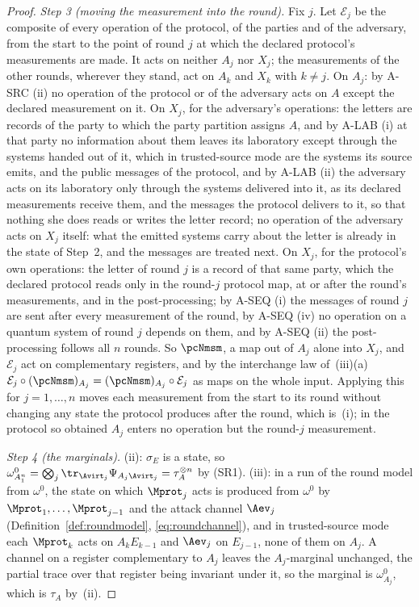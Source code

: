 \begin{proof}
\emph{Step 3 (moving the measurement into the round).} Fix $j$. Let
$\mathcal{E}_j$ be the composite of every operation of the protocol, of the
parties and of the adversary, from the start to the point of round $j$ at
which the declared protocol's measurements are made. It acts on neither $A_j$
nor $X_j$; the measurements of the other rounds, wherever they stand, act on
$A_k$ and $X_k$ with $k\ne j$. On $A_j$: by A-SRC (ii) no operation of the
protocol or of the adversary acts on $A$ except the declared measurement on it.
On $X_j$, for the adversary's operations: the letters are records of the
party to which the party partition assigns $A$, and by A-LAB (i) at that party
no information about them leaves its laboratory except through the systems
handed out of it, which in trusted-source mode are the systems its source
emits, and the public messages of the protocol, and by A-LAB (ii) the
adversary acts on its laboratory only through the systems delivered into it,
as its declared measurements receive them, and the messages the protocol
delivers to it, so that nothing she does reads or writes the letter record;
no operation of the adversary acts on $X_j$
itself: what the emitted systems carry about the
letter is already in the state of Step~2, and the messages are treated next. On $X_j$,
for the protocol's own operations: the letter of round $j$ is a record of
that same party, which the declared protocol
reads only in the round-$j$ protocol map, at or after the round's
measurements, and in the post-processing; by A-SEQ (i) the messages of round
$j$ are sent after every measurement of the round, by A-SEQ (iv) no operation
on a quantum system of round $j$ depends on them, and by A-SEQ (ii) the
post-processing follows all $n$ rounds. So $\pcNmsm$, a map out of $A_j$
alone into $X_j$, and $\mathcal{E}_j$ act on complementary registers, and by
the interchange law of \,(iii)(a)
$\mathcal{E}_j\circ(\pcNmsm)_{A_j}=(\pcNmsm)_{A_j}\circ\mathcal{E}_j$ as maps on
the whole input. Applying this for $j=1,\dots,n$ moves each measurement from
the start to its round without changing any state the protocol produces after
the round, which is~(i); in the protocol so obtained $A_j$ enters no operation
but the round-$j$ measurement.

\emph{Step 4 (the marginals).} (ii): $\sigma_E$ is a state, so
$\omega^{0}_{A_1^n}=\bigotimes_j\tr_{\Avirt_j}\Psi_{A_j\Avirt_j}
=\tau_A^{\otimes n}$ by (SR1). (iii): in a run of the round model from
$\omega^{0}$, the state on which $\Mprot_j$ acts is produced from $\omega^{0}$
by $\Mprot_1,\dots,\Mprot_{j-1}$ and the attack channel $\Aev_j$
(Definition~\ref{def:roundmodel}, \eqref{eq:roundchannel}), and in
trusted-source mode each $\Mprot_k$ acts on $A_kE_{k-1}$ and $\Aev_j$ on
$E_{j-1}$, none of them on $A_j$. A channel on a register complementary to
$A_j$ leaves the $A_j$-marginal unchanged, the partial trace over that
register being invariant under it, so the marginal is $\omega^{0}_{A_j}$, which
is $\tau_A$ by~(ii).
\end{proof}

